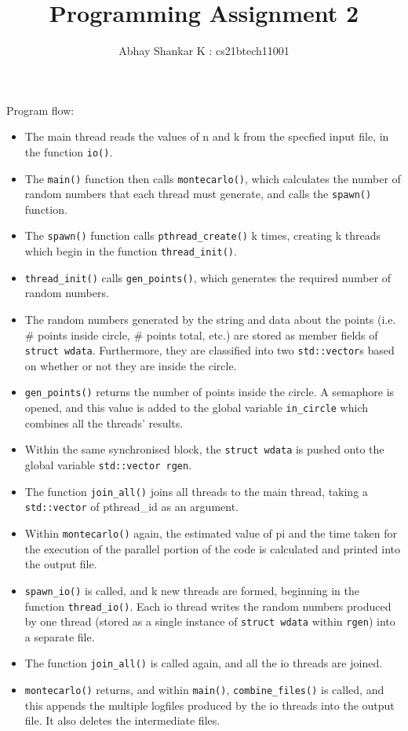 \documentclass{amsart}           %
\newcommand{\me}{\author{Abhay Shankar K : cs21btech11001}
\maketitle}
\begin{document}
    \title{Programming Assignment 2}
    \me
 
    Program flow:
    \begin{itemize}
        \item The main thread reads the values of n and k from the specfied input file, in the function \texttt{io()}.
        \item The \texttt{main()} function then calls \texttt{montecarlo()}, which calculates the number of random numbers that each thread must generate, and calls the \texttt{spawn()} function.
        \item The \texttt{spawn()} function calls \texttt{pthread\_create()} k times, creating k threads which begin in the function \texttt{thread\_init()}.
        \item \texttt{thread\_init()} calls \texttt{gen\_points()}, which generates the required number of random numbers.
        \item The random numbers generated by the string and data about the points (i.e. \# points inside circle, \# points total, etc.) are stored as member fields of \texttt{struct wdata}. Furthermore, they are classified into two \texttt{std::vector}s based on whether or not they are inside the circle.
        \item \texttt{gen\_points()} returns the number of points inside the circle. A semaphore is opened, and this value is added to the global variable \texttt{in\_circle} which combines all the threads' results.
        \item Within the same synchronised block, the \texttt{struct wdata} is pushed onto the global variable \texttt{std::vector rgen}. 
        \item The function \texttt{join\_all()} joins all threads to the main thread, taking a \texttt{std::vector} of pthread\_id as an argument.
        \item Within \texttt{montecarlo()} again, the estimated value of pi and the time taken for the execution of the parallel portion of the code is calculated and printed into the output file.
        \item \texttt{spawn\_io()} is called, and k new threads are formed, beginning in the function \texttt{thread\_io()}. Each io thread writes the random numbers produced by one thread (stored as a single instance of \texttt{struct wdata} within \texttt{rgen}) into a separate file.
        \item The function \texttt{join\_all()} is called again, and all the io threads are joined.
        \item \texttt{montecarlo()} returns, and within \texttt{main()}, \texttt{combine\_files()} is called, and this appends the multiple logfiles produced by the io threads into the output file. It also deletes the intermediate files.
    \end{itemize}
\end{document}
